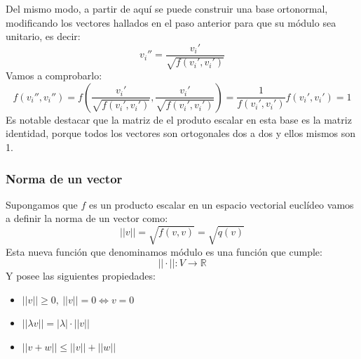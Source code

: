 \documentclass[10pt,a4paper,openright]{book}
\begin{document}
Del mismo modo, a partir de aquí se puede construir una base ortonormal, modificando los vectores hallados en el paso anterior para que su módulo sea unitario, es decir:
$$v_i''= \frac{v_i'}{\sqrt{f(v_i',v_i')}}$$
Vamos a comprobarlo:
$$f(v_i'', v_i'')=f\left(\frac{v_i'}{\sqrt{f(v_i',v_i')}},\frac{v_i'}{\sqrt{f(v_i',v_i')}}\right) = \frac{1}{f(v_i',v_i')}f(v_i',v_i') = 1$$
Es notable destacar que la matriz de el produto escalar en esta base es la matriz identidad, porque todos los vectores son ortogonales dos a dos y ellos mismos son 1.

\subsubsection*{Norma de un vector}
Supongamos que $f$ es un producto escalar en un espacio vectorial euclídeo vamos a definir la norma de un vector como:
$$||v|| = \sqrt{f(v,v)} =\sqrt{q(v)}$$
Esta nueva función que denominamos módulo es una función que cumple:
$$||\cdot||: V\rightarrow \mathbb R$$
Y posee las siguientes propiedades:
\begin{itemize}
\item $||v||\geq 0, \ ||v||=0\Leftrightarrow v=0$
\item $||\lambda v|| = |\lambda|\cdot ||v||$
\item $||v+w||\leq ||v||+||w||$
\end{itemize}
\end{document}
